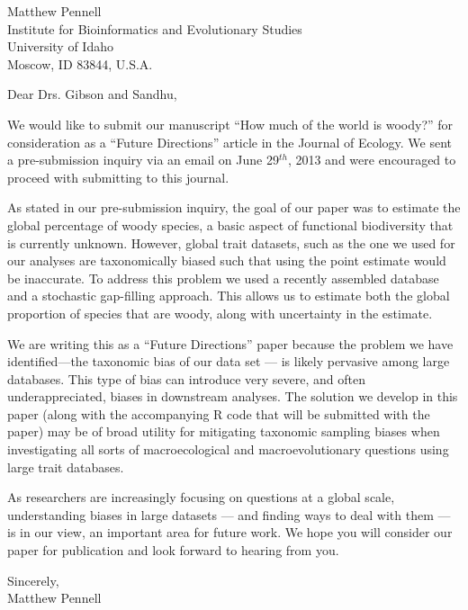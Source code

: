 \documentclass[a4paper,12pt]{article}
\begin{document}
{\raggedleft
  Matthew Pennell\\
  Institute for Bioinformatics and Evolutionary Studies\\
  University of Idaho\\
 Moscow, ID 83844, U.S.A.\\[2ex]
}

\vspace{3ex}

Dear Drs. Gibson and Sandhu,

We would like to submit our manuscript ``How much of the world is woody?'' for consideration as a “Future Directions” article in the Journal of Ecology. We sent a pre-submission inquiry via an email on June 29$^{th}$, 2013 and were encouraged to proceed with submitting to this journal.
					
As stated in our pre-submission inquiry, the goal of our paper was to estimate the global percentage of woody species, a basic aspect of functional biodiversity that is currently unknown. However, global trait datasets, such as the one we used for our analyses are taxonomically biased such that using the point estimate would be inaccurate. To address this problem we used a recently assembled database and a stochastic gap-filling approach. This allows us to estimate both the global proportion of species that are woody, along with uncertainty in the estimate. 

We are writing this as a ``Future Directions'' paper because the problem we have identified—the taxonomic bias of our data set --- is likely pervasive among large databases. This type of bias can introduce very severe, and often underappreciated, biases in downstream analyses. The solution we develop in this paper (along with the accompanying R code that will be submitted with the paper) may be of broad utility for mitigating taxonomic sampling biases when investigating all sorts of macroecological and macroevolutionary questions using large trait databases.

As researchers are increasingly focusing on questions at a global scale, understanding biases in large datasets --- and finding ways to deal with them --- is in our view, an important area for future work. We hope you will consider our paper for publication and look forward to hearing from you.

\begin{flushright}
\vspace{2ex}
\hspace{.2\textwidth}Sincerely,\\
\hspace*{.3\textwidth}
Matthew Pennell
\end{flushright}
\end{document}
